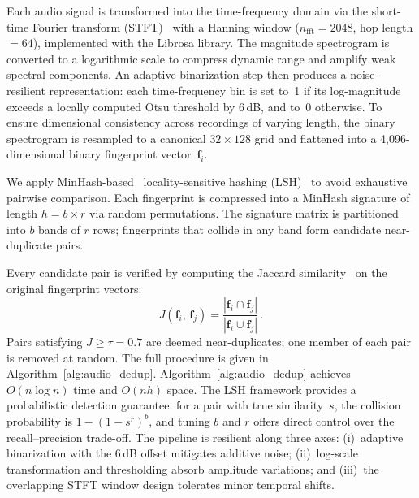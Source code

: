 \documentclass[conference]{IEEEtran}
\begin{document}
Each audio signal is transformed into the time-frequency domain via the short-time Fourier transform (STFT)~\cite{zhang2015sift} with a Hanning window ($n_{\text{fft}}{=}2048$, hop length${=}64$), implemented with the Librosa library. The magnitude spectrogram is converted to a logarithmic scale to compress dynamic range and amplify weak spectral components. An adaptive binarization step then produces a noise-resilient representation: each time-frequency bin is set to~1 if its log-magnitude exceeds a locally computed Otsu threshold by 6\,dB, and to~0 otherwise. To ensure dimensional consistency across recordings of varying length, the binary spectrogram is resampled to a canonical $32 \times 128$ grid and flattened into a 4,096-dimensional binary fingerprint vector~$\mathbf{f}_i$.


We apply MinHash-based~\cite{broder1997resemblance} locality-sensitive hashing (LSH)~\cite{datar2004lsh} to avoid exhaustive pairwise comparison. Each fingerprint is compressed into a MinHash signature of length $h = b \times r$ via random permutations. The signature matrix is partitioned into $b$ bands of $r$ rows; fingerprints that collide in any band form candidate near-duplicate pairs.

Every candidate pair is verified by computing the Jaccard similarity~\cite{leskovec2014miningjaccard} on the original fingerprint vectors:
\vspace{-1mm}
\begin{equation}\label{eq:jaccard_audio}
    J(\mathbf{f}_i,\, \mathbf{f}_j) = \frac{|\mathbf{f}_i \cap \mathbf{f}_j|}{|\mathbf{f}_i \cup \mathbf{f}_j|}\,.
\end{equation}
\vspace{-1mm}
Pairs satisfying $J \geq \tau = 0.7$ are deemed near-duplicates; one member of each pair is removed at random. The full procedure is given in Algorithm~\ref{alg:audio_dedup}.
Algorithm~\ref{alg:audio_dedup} achieves $O(n \log n)$ time and $O(nh)$ space. The LSH framework provides a probabilistic detection guarantee: for a pair with true similarity~$s$, the collision probability is $1 - (1 - s^r)^b$, and tuning $b$ and $r$ offers direct control over the recall--precision trade-off.
The pipeline is resilient along three axes: (i)~adaptive binarization with the 6\,dB offset mitigates additive noise; (ii)~log-scale transformation and thresholding absorb amplitude variations; and (iii)~the overlapping STFT window design tolerates minor temporal shifts.
\end{document}
